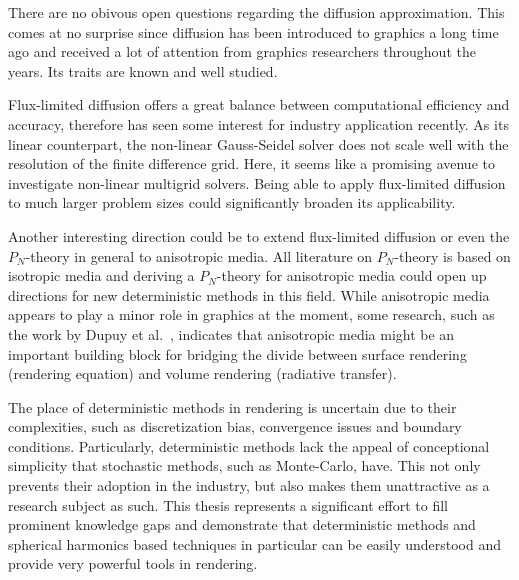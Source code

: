 There are no obivous open questions regarding the diffusion approximation. This comes at no surprise since diffusion has been introduced to graphics a long time ago and received a lot of attention from graphics researchers throughout the years. Its traits are known and well studied.

Flux-limited diffusion offers a great balance between computational efficiency and accuracy, therefore has seen some interest for industry application recently. As its linear counterpart, the non-linear Gauss-Seidel solver does not scale well with the resolution of the finite difference grid. Here, it seems like a promising avenue to investigate non-linear multigrid solvers. Being able to apply flux-limited diffusion to much larger problem sizes could significantly broaden its applicability.

Another interesting direction could be to extend flux-limited diffusion or even the $P_N$-theory in general to anisotropic media. All literature on $P_N$-theory is based on isotropic media and deriving a $P_N$-theory for anisotropic media could open up directions for new deterministic methods in this field. While anisotropic media appears to play a minor role in graphics at the moment, some research, such as the work by Dupuy et al.~\cite{Dupuy16}, indicates that anisotropic media might be an important building block for bridging the divide between surface rendering (rendering equation) and volume rendering (radiative transfer).

The place of deterministic methods in rendering is uncertain due to their complexities, such as discretization bias, convergence issues and boundary conditions. Particularly, deterministic methods lack the appeal of conceptional simplicity that stochastic methods, such as Monte-Carlo, have. This not only prevents their adoption in the industry, but also makes them unattractive as a research subject as such. This thesis represents a significant effort to fill prominent knowledge gaps and demonstrate that deterministic methods and spherical harmonics based techniques in particular can be easily understood and provide very powerful tools in rendering.







